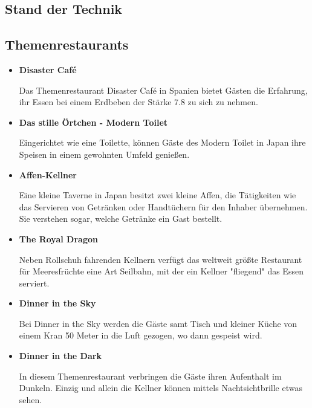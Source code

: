   \subsection{Stand der Technik}
  \subsection*{Themenrestaurants}

  \begin{itemize}
    \item \textbf{Disaster Café}

    Das Themenrestaurant {Disaster Café\cite{disastercafe}} in Spanien bietet Gästen die Erfahrung, ihr Essen bei einem Erdbeben
    der Stärke 7.8 zu sich zu nehmen.

    \item \textbf{Das stille Örtchen - Modern Toilet}

    Eingerichtet wie eine Toilette, können Gäste des {Modern Toilet\cite{moderntoilet}} in Japan ihre Speisen in einem gewohnten Umfeld genießen.

    \item \textbf{Affen-Kellner}

    {Eine kleine Taverne in Japan\cite{affenkellner}} besitzt zwei kleine Affen, die Tätigkeiten wie das Servieren von Getränken oder Handtüchern
    für den Inhaber übernehmen. Sie verstehen sogar, welche Getränke ein Gast bestellt.

    \item \textbf{The Royal Dragon}

    Neben Rollschuh fahrenden Kellnern verfügt das weltweit größte {Restaurant für Meeresfrüchte\cite{royaldragon}} eine
    Art Seilbahn, mit der ein Kellner "fliegend" das Essen serviert.

    \item \textbf{Dinner in the Sky}

    Bei {Dinner in the Sky\cite{dinnerinthesky}} werden die Gäste samt Tisch und kleiner Küche von einem Kran 50 Meter
    in die Luft gezogen, wo dann gespeist wird.

    \item \textbf{Dinner in the Dark}

    In diesem {Themenrestaurant\cite{dinnerinthedark}} verbringen die Gäste ihren Aufenthalt im Dunkeln. Einzig und allein die
    Kellner können mittels Nachtsichtbrille etwas sehen.

  \end{itemize}

